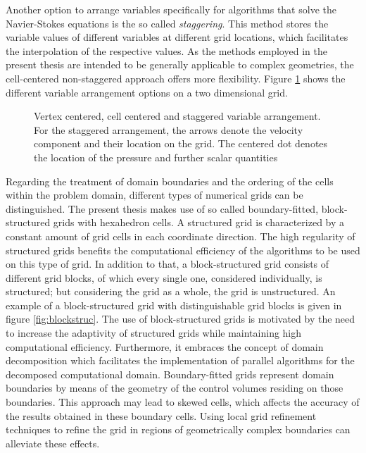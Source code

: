 Another option to arrange variables specifically for algorithms that solve the Navier-Stokes equations is the so called \emph{staggering}. This method stores the variable values of different variables at different grid locations, which facilitates the interpolation of the respective values. As the methods employed in the present thesis are intended to be generally applicable to complex geometries, the cell-centered non-staggered approach offers more flexibility.  Figure \ref{fig:cell vertex} shows the different variable arrangement options on a two dimensional grid.

\begin{figure}[h!]
    \hfil
    \hfil
    \caption{Vertex centered, cell centered and staggered variable arrangement. For the staggered arrangement, the arrows denote the velocity component and their location on the grid. The centered dot denotes the location of the pressure and further scalar quantities}
   \label{fig:cell vertex}
\end{figure}

Regarding the treatment of domain boundaries and the ordering of the cells within the problem domain, different types of numerical grids can be distinguished. The present thesis makes use of so called boundary-fitted, block-structured grids with hexahedron cells. A structured grid is characterized by a constant amount of grid cells in each coordinate direction. The high regularity of structured grids benefits the computational efficiency of the algorithms to be used on this type of grid. In addition to that, a block-structured grid consists of different grid blocks, of which every single one, considered individually, is structured; but considering the grid as a whole, the grid is unstructured. An example of a block-structured grid with distinguishable grid blocks is given in figure \ref{fig:blockstruc}. The use of block-structured grids is motivated by the need to increase the adaptivity of structured grids while maintaining high computational efficiency. Furthermore, it embraces the concept of domain decomposition which facilitates the implementation of parallel algorithms for the decomposed computational domain. Boundary-fitted grids represent domain boundaries by means of the geometry of the control volumes residing on those boundaries. This approach may lead to skewed cells, which affects the accuracy of the results obtained in these boundary cells. Using local grid refinement techniques to refine the grid in regions of geometrically complex boundaries can alleviate these effects.

